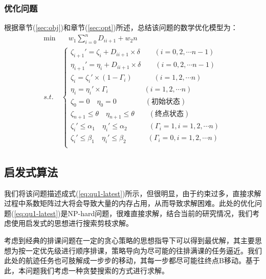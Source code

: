 \subsubsection{优化问题}
根据章节(\ref{sec:obj})和章节(\ref{sec:opt})所述，总结该问题的数学优化模型为：
\begin{equation}\label{eq:qu1-latest}
\begin{aligned}
     \min & \quad w_1\sum_{i=0}^n D_{ii+1} + w_2 n \\
    s.t.  & \begin{cases}
        \zeta_{i+1}' = \zeta_{i} + D_{ii+1}\times \delta  \qquad (i = 0,2,\cdots n-1 )\\
        \eta_{i+1}' = \eta_{i}+ D_{ii+1}\times \delta \qquad (i = 0,2,\cdots n-1 ) \\
        \zeta_{i} = \zeta_{i}' \times (1- \Gamma_{i} ) \quad\qquad (i = 1,2,\cdots n ) \\
        \eta_{i} = \eta_{i}' \times \Gamma_{i} \qquad\quad\qquad (i = 1,2,\cdots n ) \\
        \zeta_{0}  = 0  \quad \eta_{0}  = 0    \qquad\qquad(\text{初始状态})\\
        \zeta_{n+1} \leq  \theta \quad \eta_{n+1} \leq \theta \qquad(\text{终点状态})\\
        \zeta_{i}'  \leq \alpha_1 \quad \eta_{i}' \leq \alpha_2  \quad\qquad (\Gamma_i = 1,i = 1,2,\cdots n) \\
        \zeta_{i}'  \leq \beta_1 \quad \eta_{i}' \leq \beta_2 \quad\qquad (\Gamma_i = 0,i = 1,2,\cdots n) \\
    \end{cases}
\end{aligned}
\end{equation}

\subsection{启发式算法}
我们将该问题描述成式(\ref{eq:qu1-latest})所示，但很明显，由于约束过多，直接求解过程中系数矩阵过大将会导致大量的内存占用，从而导致求解困难。此处的优化问题(\ref{eq:qu1-latest})是NP-hard问题，很难直接求解，结合当前的研究情况，我们考虑使用启发式的思想进行搜索剪枝求解。

考虑到经典的排课问题在一定的贪心策略的思想指导下可以得到最优解，其主要思想为按一定优先级进行顺序排课，策略导向为尽可能的往排满课的任务逼近。我们此处的航迹任务也可肢解成一步步的移动，其每一步都尽可能往终点B移动。基于此，本问题我们考虑一种贪婪搜索的方式进行求解。

